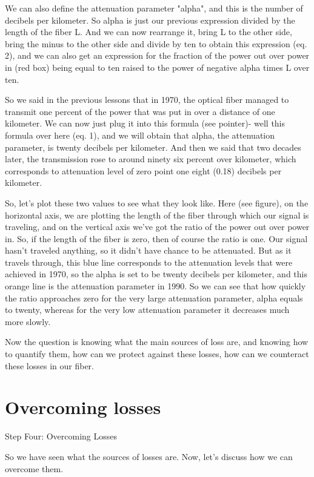 We can also define the attenuation parameter "alpha", and this is the number of decibels per kilometer. So alpha is just our previous expression divided by the length of the fiber L. And we can now rearrange it, bring L to the other side, bring the minus to the other side and divide by ten to obtain this expression (eq. 2), and we can also get an expression for the fraction of the power out over power in (red box) being equal to ten raised to the power of negative alpha times L over ten.

So we said in the previous lessons that in 1970, the optical fiber managed to transmit one percent of the power that was put in over a distance of one kilometer. We can now just plug it into this formula (see pointer)- well this formula over here (eq. 1), and we will obtain that alpha, the attenuation parameter, is twenty decibels per kilometer. And then we said that two decades later, the transmission rose to around ninety six percent over kilometer, which corresponds to attenuation level of zero point one eight (0.18) decibels per kilometer.

So, let's plot these two values to see what they look like. Here (see figure), on the horizontal axis, we are plotting the length of the fiber through which our signal is traveling, and on the vertical axis we've got the ratio of the power out over power in. So, if the length of the fiber is zero, then of course the ratio is one. Our signal hasn't traveled anything, so it didn't have chance to be attenuated. But as it travels through, this blue line corresponds to the attenuation levels that were achieved in 1970, so the alpha is set to be twenty decibels per kilometer, and this orange line is the attenuation parameter in 1990. So we can see that how quickly the ratio approaches zero for the very large attenuation parameter, alpha equals to twenty, whereas for the very low attenuation parameter it decreases much more slowly.

Now the question is knowing what the main sources of loss are, and knowing how to quantify them, how can we protect against these losses, how can we counteract these losses in our fiber.



\section{Overcoming losses}

Step Four: Overcoming Losses

So we have seen what the sources of losses are. Now, let's discuss how we can overcome them.

